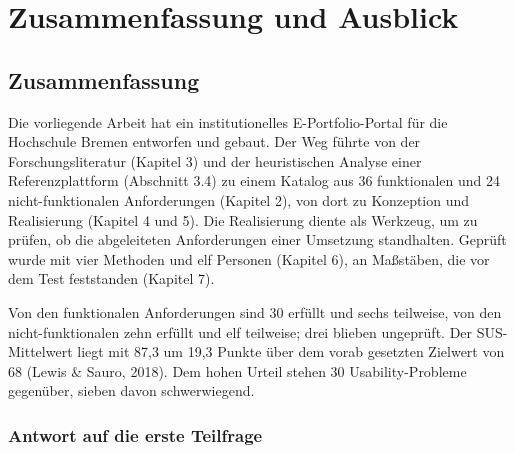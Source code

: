 
\chapter{Zusammenfassung und Ausblick}
\label{kap:zusammenfassung}

\section{Zusammenfassung}
\label{sec:gesamtzusammenfassung}

Die vorliegende Arbeit hat ein institutionelles E-Portfolio-Portal für die Hochschule Bremen entworfen und gebaut. Der Weg führte von der Forschungsliteratur (Kapitel 3) und der heuristischen Analyse einer Referenzplattform (Abschnitt 3.4) zu einem Katalog aus 36 funktionalen und 24 nicht-funktionalen Anforderungen (Kapitel 2), von dort zu Konzeption und Realisierung (Kapitel 4 und 5). Die Realisierung diente als Werkzeug, um zu prüfen, ob die abgeleiteten Anforderungen einer Umsetzung standhalten. Geprüft wurde mit vier Methoden und elf Personen (Kapitel 6), an Maßstäben, die vor dem Test feststanden (Kapitel 7).

Von den funktionalen Anforderungen sind 30 erfüllt und sechs teilweise, von den nicht-funktionalen zehn erfüllt und elf teilweise; drei blieben ungeprüft. Der SUS-Mittelwert liegt mit 87,3 um 19,3 Punkte über dem vorab gesetzten Zielwert von 68 (Lewis \& Sauro, 2018). Dem hohen Urteil stehen 30 Usability-Probleme gegenüber, sieben davon schwerwiegend.

\subsection{Antwort auf die erste Teilfrage}

